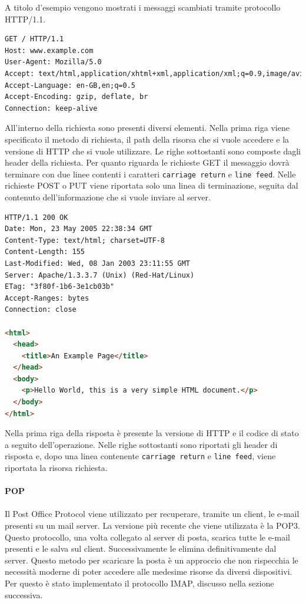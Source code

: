 \documentclass[12pt]{report}
\begin{document}
A titolo d'esempio vengono mostrati i messaggi scambiati tramite protocollo HTTP/1.1.

\begin{lstlisting}[language=html, caption=Richiesta del client, basicstyle=\ttfamily\footnotesize, numbers=none]
GET / HTTP/1.1
Host: www.example.com
User-Agent: Mozilla/5.0
Accept: text/html,application/xhtml+xml,application/xml;q=0.9,image/avif,image/webp,*/*;q=0.8
Accept-Language: en-GB,en;q=0.5
Accept-Encoding: gzip, deflate, br
Connection: keep-alive
\end{lstlisting}

All'interno della richiesta sono presenti diversi elementi. Nella prima riga viene specificato il metodo di richiesta, il path della risorsa che si vuole accedere e la versione di HTTP che si vuole utilizzare. Le righe sottostanti sono composte dagli header della richiesta. Per quanto riguarda le richieste GET il messaggio dovrà terminare con due linee contenti i caratteri \lstinline{carriage return} e \lstinline{line feed}. Nelle richieste POST o PUT viene riportata solo una linea di terminazione, seguita dal contenuto dell'informazione che si vuole inviare al server.

\begin{lstlisting}[language=html, caption=Risposta del server, basicstyle=\ttfamily\footnotesize, numbers=none]
HTTP/1.1 200 OK
Date: Mon, 23 May 2005 22:38:34 GMT
Content-Type: text/html; charset=UTF-8
Content-Length: 155
Last-Modified: Wed, 08 Jan 2003 23:11:55 GMT
Server: Apache/1.3.3.7 (Unix) (Red-Hat/Linux)
ETag: "3f80f-1b6-3e1cb03b"
Accept-Ranges: bytes
Connection: close

<html>
  <head>
    <title>An Example Page</title>
  </head>
  <body>
    <p>Hello World, this is a very simple HTML document.</p>
  </body>
</html>
\end{lstlisting}

Nella prima riga della risposta è presente la versione di HTTP e il codice di stato a seguito dell'operazione. Nelle righe sottostanti sono riportati gli header di risposta e, dopo una linea contenente \lstinline{carriage return} e \lstinline{line feed}, viene riportata la risorsa richiesta.\cite{rfcHTTPSEMANTIC}
\\\\
\textbf{POP}
\\\\
Il Post Office Protocol viene utilizzato per recuperare, tramite un client, le e-mail presenti su un mail server. La versione più recente che viene utilizzata è la POP3. Questo protocollo, una volta collegato al server di posta, scarica tutte le e-mail presenti e le salva sul client. Successivamente le elimina definitivamente dal server. Questo metodo per scaricare la posta è un approccio che non rispecchia le necessità moderne di poter accedere alle medesime risorse da diversi dispositivi. Per questo è stato implementato il protocollo IMAP, discusso nella sezione successiva.\cite{rfcPOP}
\end{document}
